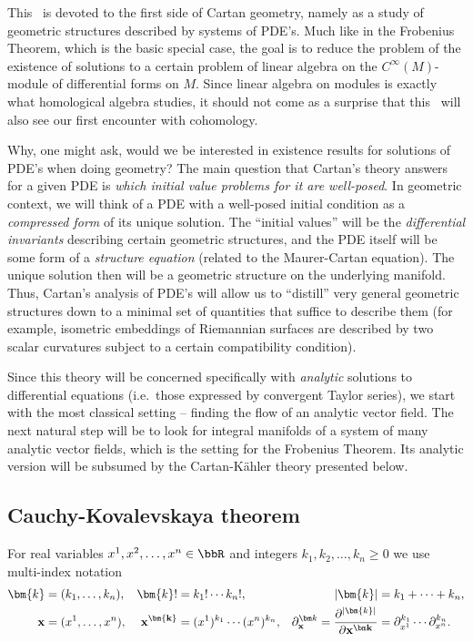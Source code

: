 This \sect\ is devoted to the first side of Cartan geometry, namely as a study of geometric structures described by systems of PDE's.
Much like in the Frobenius Theorem, which is the basic special case, the goal is to reduce the problem of the existence of solutions to a certain problem of linear algebra on the $C^\infty(M)$-module of differential forms on $M$. Since linear algebra on modules is exactly what homological algebra studies, it should not come as a surprise that this \sect\ will also see our first encounter with cohomology.

Why, one might ask, would we be interested in existence results for solutions of PDE's when doing geometry? The main question that Cartan's theory answers for a given PDE is \emph{which initial value problems for it are well-posed}. In geometric context, we will think of a PDE with a well-posed initial condition as a \emph{compressed form} of its unique solution. The ``initial values'' will be the \emph{differential invariants} describing certain geometric structures, and the PDE itself will be some form of a \emph{structure equation} (related to the Maurer-Cartan equation). The unique solution then will be a geometric structure on the underlying manifold. Thus, Cartan's analysis of PDE's will allow us to ``distill'' very general geometric structures down to a minimal set of quantities that suffice to describe them (for example, isometric embeddings of Riemannian surfaces are described by two scalar curvatures subject to a certain compatibility condition).

Since this theory will be concerned specifically with \emph{analytic} solutions to differential equations (i.e.\ those expressed by convergent Taylor series), we start with the most classical setting -- finding the flow of an analytic vector field. The next natural step will be to look for integral manifolds of a system of many analytic vector fields, which is the setting for the Frobenius Theorem. Its analytic version will be subsumed by the Cartan-K\"ahler theory presented below.




\subsection{Cauchy-Kovalevskaya theorem}


For real variables $x^1,x^2,\ldots,x^n\in\bbR$ and integers $k_1,k_2,\ldots,k_n\geq 0$ we use multi-index notation 
\begin{align}
    \bm{k}&=(k_1,\ldots,k_n), &\bm{k}!&=k_1!\cdots k_n!,&  |\bm{k}|&=k_1+\cdots+k_n,\\
    \bf{x}&=(x^1,\ldots,x^n), &\bf{x}^{\bm{k}}&=(x^1)^{k_1}\cdots (x^n)^{k_n},& \partial^{\bm k}_{\bf x}=\frac{\partial^{|\bm{k}|}}{\partial\bf{x}^{\bm k}}&=\partial^{k_1}_{x^1}\cdots \partial^{k_n}_{x^n}.
\end{align}

